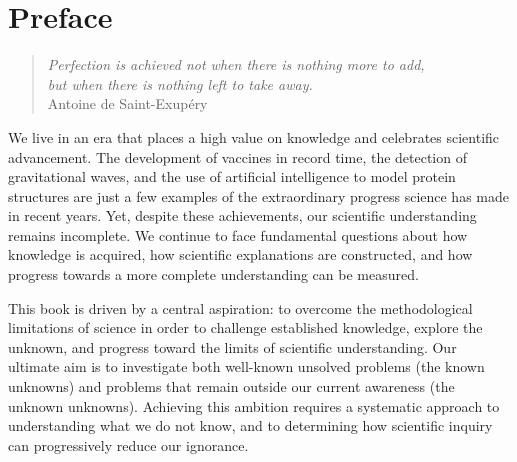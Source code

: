 %
%


\chapter*{Preface}

\begin{quote}
\begin{flushright}
\emph{Perfection is achieved not when there is nothing more to add, \\
but when there is nothing left to take away.}\\
Antoine de Saint-Exupéry\\
\end{flushright}
\end{quote}
\bigskip

%
%


We live in an era that places a high value on knowledge and celebrates scientific advancement. The development of vaccines in record time, the detection of gravitational waves, and the use of artificial intelligence to model protein structures are just a few examples of the extraordinary progress science has made in recent years. Yet, despite these achievements, our scientific understanding remains incomplete. We continue to face fundamental questions about how knowledge is acquired, how scientific explanations are constructed, and how progress towards a more complete understanding can be measured.

This book is driven by a central aspiration: to overcome the methodological limitations of science in order to challenge established knowledge, explore the unknown, and progress toward the limits of scientific understanding. Our ultimate aim is to investigate both well-known unsolved problems (the known unknowns) and problems that remain outside our current awareness (the unknown unknowns). Achieving this ambition requires a systematic approach to understanding what we do not know, and to determining how scientific inquiry can progressively reduce our ignorance.

